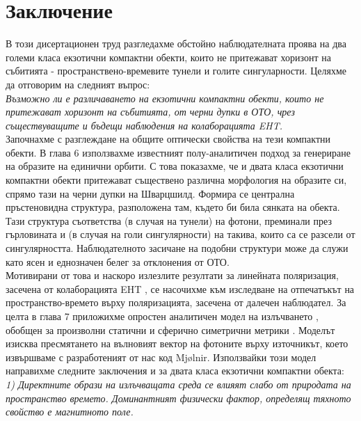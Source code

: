 \documentclass[12pt]{article}
\numberwithin{equation}{section}
\numberwithin{figure}{section}
\begin{document}
\section{Заключение}
	
	
	В този дисертационен труд разгледахме обстойно наблюдателната проява на два големи класа екзотични компактни обекти, които не притежават хоризонт на събитията - пространствено-времевите тунели и голите сингуларности. Целяхме да отговорим на следният въпрос:\\
	
	\emph{Възможно ли е различаването на екзотични компактни обекти, които не притежават хоризонт на събитията, от черни дупки в ОТО, чрез съществуващите и бъдещи наблюдения на колаборацията EHT.}\\
	
	Започнахме с разглеждане на общите оптически свойства на тези компактни обекти. В глава 6 използвахме известният полу-аналитичен подход \cite{Muller2009}\cite{Gyulchev2020}\cite{Gyulchev2021}\cite{Deliyski2022} за генериране на образите на единични орбити. С това показахме, че и двата класа екзотични компактни обекти притежават съществено различна морфология на образите си, спрямо тази на черни дупки на Шварцшилд. Формира се централна пръстеновидна структура, разположена там, където би била сянката на обекта. Тази структура съответства (в случая на тунели) на фотони, преминали през гърловината и (в случая на голи сингулярности) на такива, които са се разсели от сингулярността. Наблюдателното засичане на подобни структури може да служи като ясен и еднозначен белег за отклонения от ОТО. \\
	
	Мотивирани от това и наскоро излезлите резултати за линейната поляризация, засечена от колаборацията EHT \cite{EHT_M87_VII}\cite{EHT_M87_VIII}, се насочихме към изследване на отпечатъкът на пространство-времето върху поляризацията, засечена от далечен наблюдател. За целта в глава 7 приложихме опростен аналитичен модел на излъчването \cite{Narayan2021}, обобщен за произволни статични и сферично симетрични метрики \cite{Delijski2022}\cite{Deliyski2023}. Моделът изисква пресмятането на вълновият вектор на фотоните върху източникът, което извършваме с разработеният от нас код Mjølnir. Използвайки този модел направихме следните заключения и за двата класа екзотични компактни обекта:\\
	
	\emph{1) Директните образи на излъчващата среда се влияят слабо от природата на пространство времето. Доминантният физически фактор, определящ тяхното свойство е магнитното поле.}\\
	
\end{document}
